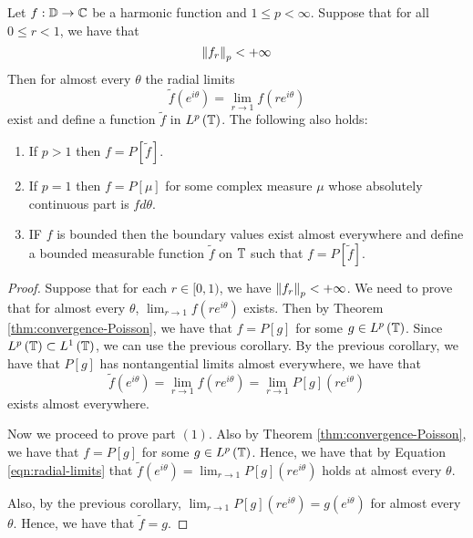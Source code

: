 \begin{corollary}
    Let $f: \mathbb D \to \mathbb C$ be a harmonic function and $1\le p <\infty$. Suppose that for all $0\le r < 1$, we have that
    \begin{equation*}
	\left\lVert f_{r} \right\rVert_{p} < +\infty
    \end{equation*}
    Then for almost every $\theta$ the radial limits 
    \begin{equation*}
	\tilde {f} (e^{i\theta} ) = \lim_{r\to 1} f\left( re^{i\theta} \right)
    \end{equation*}
    exist and define a function $\tilde f$ in $L^{p} \left( \mathbb T \right)$. The following also holds:
    \begin{enumerate}
	\item If $p>1$ then $f=P[\tilde{f}]$.
	\item If $p=1$ then $f=P[\mu]$ for some complex measure $\mu$ whose absolutely continuous part is $fd\theta$.
	\item IF $f$ is bounded then the boundary values exist almost everywhere and define a bounded measurable function $\tilde{f}$ on $\mathbb T$ such that $f=P[\tilde{f}]$.
    \end{enumerate}
    \label{cor:imp-Fatou}
\end{corollary}
\begin{proof}
    Suppose that for each $r\in [0,1)$, we have $\left\lVert f_{r} \right\rVert_{p} < +\infty$. We need to prove that for almost every $\theta$, $\lim_{r\to 1} f\left( re^{i\theta} \right)$ exists. Then by Theorem \ref{thm:convergence-Poisson}, we have that $f=P[g]$ for some $g\in L^{p} \left( \mathbb T \right)$. Since $L^{p} \left( \mathbb T \right) \subset L^{1} \left( \mathbb T \right)$, we can use the previous corollary. By the previous corollary, we have that $P[g]$ has nontangential limits almost everywhere, we have that
    \begin{equation}
	\tilde{f} \left( e^{i\theta} \right) = \lim_{r\to 1} f(re^{i\theta}) = \lim_{r\to 1} P[g] \left( re^{i\theta} \right)
	\label{eqn:radial-limits}
    \end{equation}
    exists almost everywhere.

    Now we proceed to prove part $(1)$. Also by Theorem \ref{thm:convergence-Poisson}, we have that $f=P[g]$ for some $g\in L^{p} \left( \mathbb T \right)$. Hence, we have that by Equation \ref{eqn:radial-limits} that $\tilde{f} (e^{i\theta}) =  \lim_{r\to 1} P[g] \left( re^{i\theta} \right)$ holds at almost every $\theta$.

    Also, by the previous corollary, $\lim_{r\to 1} P[g] \left( re^{i\theta} \right) = g(e^{i\theta})$ for almost every $\theta$. Hence, we have that $\tilde{f} = g$.

\end{proof}

